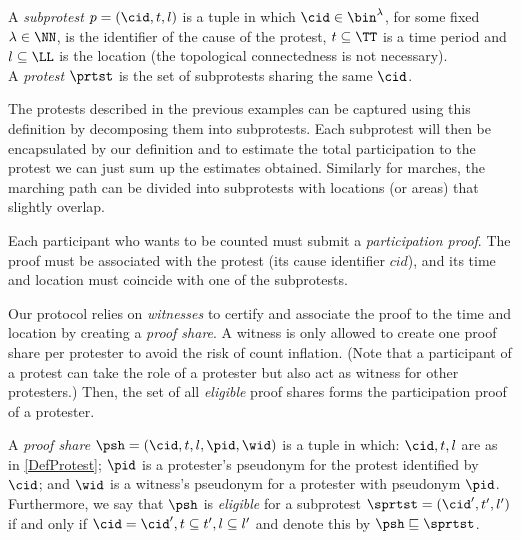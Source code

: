\begin{definition}\label{DefProtest}
  A \emph{subprotest} \(p = (\cid, t, l)\) is a tuple in which \(\cid\in \bin^{\lambda}\), for some fixed \(\lambda\in \NN\), is the identifier of the cause of the protest, \(t \subseteq \TT\) is a time period and \(l \subseteq \LL\) is the location (the topological connectedness is not necessary).\\
  A \emph{protest} \(\prtst\) is the set of subprotests sharing the same \(\cid\).
\end{definition}

The protests described in the previous examples can be captured using this definition by decomposing them into subprotests.
Each subprotest will then be encapsulated by our definition and to estimate the total participation to the protest we can just sum up the estimates obtained.
Similarly for marches, the marching path can be divided into subprotests with locations (or areas) that slightly overlap.

Each participant who wants to be counted must submit a \emph{participation proof}.
The proof must be associated with the protest (\ie its cause identifier \(cid\)), and its time and location must coincide with one of the subprotests.

Our protocol relies on \emph{witnesses} to certify and associate the proof to the time and location by creating a \emph{proof share}.
A witness is only allowed to create one proof share per protester to avoid the risk of count inflation.
(Note that a participant of a protest can take the role of a protester but also 
act as witness for other protesters.)
Then, the set of all \emph{eligible} proof shares forms the participation proof of a protester.


\begin{definition}%
  \label{DefProofShare}\label{DefProofShares}
  A \emph{proof share} \(\psh = (\cid, t, l, \pid, \wid)\) is a tuple in which: 
  \(\cid, t, l\) are as in \cref{DefProtest};
  \(\pid\) is a protester's pseudonym for the protest identified by \(\cid\); and \(\wid\) is a witness's pseudonym for a protester with pseudonym \(\pid\).\\
  Furthermore, we say that \(\psh\) is \emph{eligible} for a subprotest \(\sprtst = (\cid', t', l')\) if and only if \(\cid = \cid', t\subseteq t', l\subseteq l'\) and denote this by 
  \(\psh \sqsubseteq \sprtst\).
  
\end{definition}

